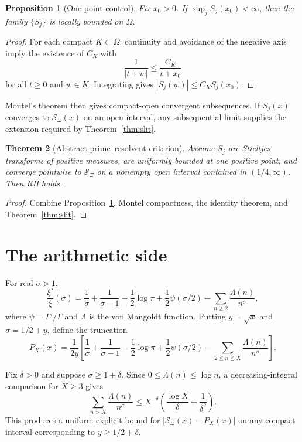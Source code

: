 \documentclass[11pt]{article}
\newtheorem{theorem}{Theorem}[section]
\newtheorem{proposition}[theorem]{Proposition}
\theoremstyle{definition}
\newcommand{\XiR}{\mathcal S_{\Xi}}
\begin{document}
\begin{proposition}[One-point control]\label{prop:normal}
Fix $x_0>0$.  If $\sup_j S_j(x_0)<\infty$, then the family $\{S_j\}$ is locally
bounded on $\Omega$.
\end{proposition}

\begin{proof}
For each compact $K\subset\Omega$, continuity and avoidance of the negative
axis imply the existence of $C_K$ with
\[
\frac1{|t+w|}\leq\frac{C_K}{t+x_0}
\]
for all $t\ge0$ and $w\in K$.  Integrating gives
$|S_j(w)|\le C_K S_j(x_0)$.
\end{proof}

Montel's theorem then gives compact-open convergent subsequences.  If $S_j(x)$
converges to $\XiR(x)$ on an open interval, any subsequential limit supplies the
extension required by Theorem~\ref{thm:slit}.

\begin{theorem}[Abstract prime--resolvent criterion]\label{thm:abstract}
Assume $S_j$ are Stieltjes transforms of positive measures, are uniformly
bounded at one positive point, and converge pointwise to $\XiR$ on a nonempty
open interval contained in $(1/4,\infty)$.  Then RH holds.
\end{theorem}

\begin{proof}
Combine Proposition~\ref{prop:normal}, Montel compactness, the identity theorem,
and Theorem~\ref{thm:slit}.
\end{proof}

\section{The arithmetic side}

For real $\sigma>1$,
\begin{equation}\label{eq:logxi}
\frac{\xi'}{\xi}(\sigma)
=\frac1\sigma+\frac1{\sigma-1}-\frac12\log\pi
+\frac12\psi(\sigma/2)
-\sum_{n\ge2}\frac{\Lambda(n)}{n^\sigma},
\end{equation}
where $\psi=\Gamma'/\Gamma$ and $\Lambda$ is the von Mangoldt function.
Putting $y=\sqrt{x}$ and $\sigma=1/2+y$, define the truncation
\begin{equation}\label{eq:PX}
P_X(x)=\frac1{2y}\left[
\frac1\sigma+\frac1{\sigma-1}-\frac12\log\pi
+\frac12\psi(\sigma/2)
-\sum_{2\le n\le X}\frac{\Lambda(n)}{n^\sigma}
\right].
\end{equation}

Fix $\delta>0$ and suppose $\sigma\ge1+\delta$.  Since
$0\le\Lambda(n)\le\log n$, a decreasing-integral comparison for $X\ge3$ gives
\begin{equation}\label{eq:tail}
\sum_{n>X}\frac{\Lambda(n)}{n^\sigma}
\le X^{-\delta}
\left(\frac{\log X}{\delta}+\frac1{\delta^2}\right).
\end{equation}
This produces a uniform explicit bound for
$|\XiR(x)-P_X(x)|$ on any compact interval corresponding to
$y\ge1/2+\delta$.
\end{document}
